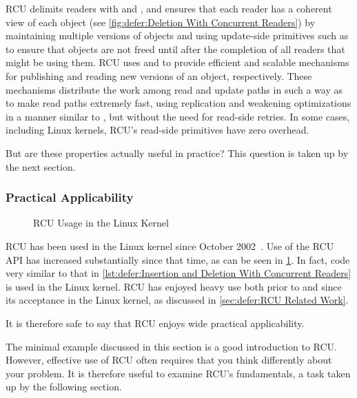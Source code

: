 RCU delimits readers with  and ,
and ensures that each reader has a coherent view of each object
(see \cref{fig:defer:Deletion With Concurrent Readers}) by
maintaining multiple versions of objects and using update-side primitives
such as  to ensure that objects are not
freed until after the completion of all readers that might be using them.
RCU uses  and  to provide
efficient and scalable mechanisms for publishing and reading new versions
of an object, respectively.
These mechanisms distribute the work among read and
update paths in such a way as to make read paths extremely fast, using
replication and weakening optimizations in a manner similar to
, but without the need for read-side retries.
In some cases, including  Linux kernels,
RCU's read-side primitives have zero overhead.

But are these properties actually useful in practice?
This question is taken up by the next section.

\subsubsection{Practical Applicability}
\label{sec:defer:Practical Applicability}

\begin{figure}
\centering
{}
\caption{RCU Usage in the Linux Kernel}
\label{fig:defer:RCU Usage in the Linux Kernel}
\end{figure}

RCU has been used in the Linux kernel since
October 2002~\cite{Torvalds2.5.43}.
Use of the RCU API has increased substantially since that time,
as can be seen in
\cref{fig:defer:RCU Usage in the Linux Kernel}.
In fact, code very similar to that in
\cref{lst:defer:Insertion and Deletion With Concurrent Readers}
is used in the Linux kernel.
RCU has enjoyed heavy use both prior to and since its acceptance
in the Linux kernel, as discussed in
\cref{sec:defer:RCU Related Work}.

It is therefore safe to say that RCU enjoys wide practical applicability.

The minimal example discussed in this section is a good introduction to RCU\@.
However, effective use of RCU often requires that you think differently
about your problem.
It is therefore useful to examine RCU's fundamentals, a task taken up
by the following section.
